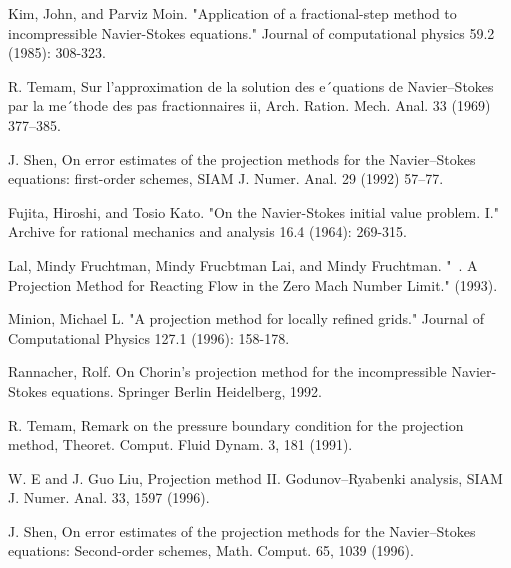 \begin{thebibliography}{88}
  Kim, John, and Parviz Moin. "Application of a fractional-step method to incompressible Navier-Stokes equations." Journal of computational physics 59.2 (1985): 308-323.

  R. Temam, Sur l’approximation de la solution des e´quations de Navier–Stokes par la me´thode des pas fractionnaires ii, Arch. Ration. Mech. Anal. 33 (1969) 377–385.
 
  J. Shen, On error estimates of the projection methods for the Navier–Stokes equations: first-order schemes, SIAM J. Numer. Anal. 29 (1992) 57–77.
 
  Fujita, Hiroshi, and Tosio Kato. "On the Navier-Stokes initial value problem. I." Archive for rational mechanics and analysis 16.4 (1964): 269-315.
 
  Lal, Mindy Fruchtman, Mindy Frucbtman Lai, and Mindy Fruchtman. "~. A Projection Method for Reacting Flow in the Zero Mach Number Limit." (1993).
 
  Minion, Michael L. "A projection method for locally refined grids." Journal of Computational Physics 127.1 (1996): 158-178.
 
  Rannacher, Rolf. On Chorin's projection method for the incompressible Navier-Stokes equations. Springer Berlin Heidelberg, 1992.
 
  R. Temam, Remark on the pressure boundary condition for the projection method, Theoret. Comput. Fluid Dynam. 3, 181 (1991).
 
  W. E and J. Guo Liu, Projection method II. Godunov–Ryabenki analysis, SIAM J. Numer. Anal. 33, 1597 (1996).
 
  J. Shen, On error estimates of the projection methods for the Navier–Stokes equations: Second-order schemes, Math. Comput. 65, 1039 (1996).
 
\end{thebibliography}